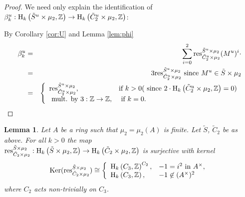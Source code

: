 \documentclass[12pt]{amsart}
\newtheorem{lem}{Lemma}[section]
\theoremstyle{definition}
\newcommand{\Z}{\Bbb{Z}}
\newcommand{\<}{\langle}
\renewcommand{\>}{\rangle}
\renewcommand{\ker}[1]{\mathrm{Ker}(#1)}
\newcommand{\ho}[3]{\mathrm{H}_{#1}\left( #2,#3 \right)}
\newcommand{\Res}[2]{\mathrm{res}_{#1}^{#2}}
\begin{document}
\begin{proof} We need only explain the identification of $\beta_k^u:\ho{k}{\tilde{S}^u\times\mu_2}{\Z}\to \ho{k}{\tilde{C}_2^u\times\mu_2}{\Z}$:

 By Corollary \ref{cor:U} and Lemma \ref{lem:phi}
\begin{eqnarray*}
\beta_k^u&=& \sum_{i=0}^2\Res{\tilde{C}_2^u\times\mu_2}{\tilde{S}^u\times\mu_2}(M^u)^i\cdot\\
&=& 3\Res{\tilde{C}_2^u\times\mu_2}{\tilde{S}^u\times\mu_2}\mbox{ since } M^u\in \tilde{S}\times\mu_2\\
&=&
\left\{
\begin{array}{ll}
\Res{\tilde{C}_2^u\times\mu_2}{\tilde{S}^u\times\mu_2},& \mbox{if } k>0 (\mbox{ since } 2\cdot  \ho{k}{\tilde{C}_2^u\times\mu_2}{\Z}=0)\\
\mbox{ mult. by } 3:\Z\to \Z,& \mbox{ if }k=0.
\end{array}
\right.\\
\end{eqnarray*}
\end{proof}





\begin{lem}\label{lem:res} Let $A$ be a ring such that $\mu_2=\mu_2(A)$ is finite.  Let $\tilde{S}$, $\tilde{C}_2$ be as above. For all $k>0$ the map\\
 $\Res{\tilde{C}_2\times\mu_2}{\tilde{S}\times\mu_2}:\ho{k}{\tilde{S}\times\mu_2}{\Z}\to\ho{k}{\tilde{C}_2\times\mu_2}{\Z}$ is surjective with kernel
\[
\ker{\Res{\tilde{C}_2\times\mu_2}{\tilde{S}\times\mu_2}}\cong 
\left\{
\begin{array}{ll}
\ho{k}{C_3}{\Z}^{C_2},& -1=i^2 \mbox{ in } A^\times,\\
\ho{k}{C_3}{\Z},& -1\not\in (A^\times)^2\\
\end{array}
\right.
\]
where $C_2$ acts non-trivially on $C_3$. 
\end{lem}
\end{document}
